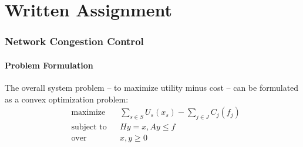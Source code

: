 \documentclass[11pt,a4paper]{article}
\begin{document}
\newpage
\part{Written Assignment}
\setcounter{section}{0}

\newcommand{\optb}{ \begin{equation} \begin{aligned} }
\newcommand{\opte}{ \end{aligned} \end{equation} }
\newtheorem{theorem}{Theorem}
\section{Network Congestion Control}
\subsection{Problem Formulation}
The overall system problem -- to maximize utility minus cost -- can be
formulated as a convex optimization problem: 
\optb
& \text{maximize} && \sum_{s \in S} U_s(x_s) - \sum_{j \in J} C_j(f_j) \\
& \text{subject to} && H y = x, A y \leq f \\
& \text{over} && x, y \geq 0 
\opte
\end{document}
